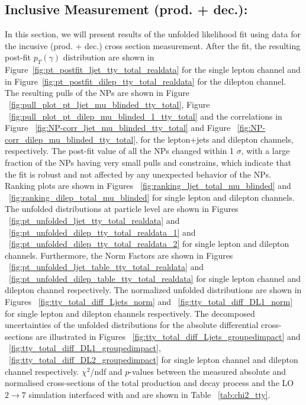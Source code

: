 \subsection{Inclusive \tty Measurement (\tty prod. + \tty dec.):}
\label{sec:tty_total_measurement}
 In this section, we will present results of the unfolded likelihood fit using data for the incusive \tty (\tty prod. + \tty dec.) cross section measurement. After the fit, the resulting post-fit $p_T(\gamma)$ distribution are shown in Figure~\ref{fig:pt_postfit_ljet_tty_total_realdata} for the single lepton channel and in Figure~\ref{fig:pt_postfit_dilep_tty_total_realdata} for the dilepton channel. The resulting pulls of the NPs  are shown in Figure ~\ref{fig:pull_plot_pt_ljet_mu_blinded_tty_total}, Figure ~\ref{fig:pull_plot_pt_dilep_mu_blinded_1_tty_total} and the correlations in Figure ~\ref{fig:NP-corr_ljet_mu_blinded_tty_total} and Figure ~\ref{fig:NP-corr_dilep_mu_blinded_tty_total}, for the lepton+jets and dilepton channels, respectively. The post-fit value of all the NPs changed within 1 $\sigma$, with a large fraction of the NPs having very small pulls and constrains, which indicate that the fit is robust and not affected by any unexpected behavior of the NPs. Ranking plots are shown in Figures ~\ref{fig:ranking_ljet_total_mu_blinded} and ~\ref{fig:ranking_dilep_total_mu_blinded} for single lepton and dilepton channels. The unfolded distributions at particle level are shown in Figures ~\ref{fig:pt_unfolded_ljet_tty_total_realdata} and ~\ref{fig:pt_unfolded_dilep_tty_total_realdata_1} and ~\ref{fig:pt_unfolded_dilep_tty_total_realdata_2} for single lepton and dilepton channels. Furthermore, the Norm Factors are shown in Figures ~\ref{fig:pt_unfolded_ljet_table_tty_total_realdata} and ~\ref{fig:pt_unfolded_dilep_table_tty_total_realdata} for single lepton channel and dilepton channel respectively. The normalized unfolded distributions are shown in Figures ~\ref{fig:tty_total_diff_Ljets_norm} and ~\ref{fig:tty_total_diff_DL1_norm} for single lepton and dilepton channels respectively. The decomposed uncertainties of the unfolded distributions for the absolute differential cross-sections are illustrated in Figures ~\ref{fig:tty_total_diff_Ljets_groupedimpact} and ~\ref{fig:tty_total_diff_DL1_groupedimpact}, ~\ref{fig:tty_total_diff_DL2_groupedimpact} for single lepton channel and dilepton channel respectively. $\chi^2$/ndf and $p$-values between the measured absolute and normalised cross-sections of the total \tty production and decay process and the LO $2\rightarrow 7$ \MGNLO simulation interfaced with \PYTHIA[8] and \HERWIG[7] are shown in Table ~\ref{tab:chi2_tty}.




